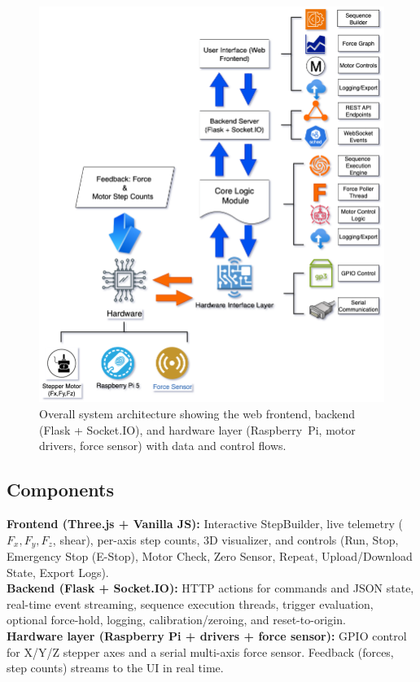 \documentclass[
    twocolumn,
    fontsize = 10pt,
    parskip = half+,
    headings = small,
    headwidth = text,
    footwidth = text,
]{scrartcl}
\begin{document}
\begin{figure}[htbp]
  \centering
  \includegraphics[width=\linewidth]{pics/gecko_architecture.drawio.png}
  \caption{Overall system architecture showing the web frontend, backend (Flask + Socket.IO), and hardware layer (Raspberry~Pi, motor drivers, force sensor) with data and control flows.}
  \label{fig:architecture}
\end{figure}


\subsection{Components}
\textbf{Frontend (Three.js + Vanilla JS):} Interactive StepBuilder, live telemetry ($F_x, F_y, F_z$, shear), per-axis step counts, 3D visualizer, and controls (Run, Stop, Emergency Stop (E-Stop), Motor Check, Zero Sensor, Repeat, Upload/Download State, Export Logs).\\
\textbf{Backend (Flask + Socket.IO):} HTTP actions for commands and JSON state, real-time event streaming, sequence execution threads, trigger evaluation, optional force-hold, logging, calibration/zeroing, and reset-to-origin.\\
\textbf{Hardware layer (Raspberry Pi + drivers + force sensor):} GPIO control for X/Y/Z stepper axes and a serial multi-axis force sensor. Feedback (forces, step counts) streams to the UI in real time.
\end{document}
